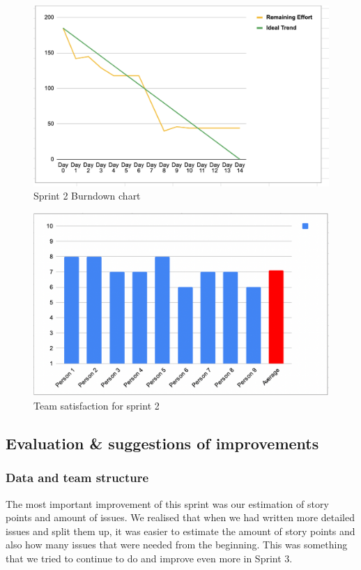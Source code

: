 \documentclass{article}
\begin{document}
\begin{figure}[h!]
    \centering
    \includegraphics[scale=0.6]{pfrFigures/Sprint2.png}
    \caption{Sprint 2 Burndown chart}
    \label{fig:Burndown1}
\end{figure}

\begin{figure}[h!]
    \centering
    \includegraphics[scale=0.6]{pfrFigures/TeamSatisfaction2.png}
    \caption{Team satisfaction for sprint 2}
    \label{fig:Satisfaction2}
\end{figure}

\subsection{Evaluation \& suggestions of improvements} 

\subsubsection{Data and team structure}
The most important improvement of this sprint was our estimation of story points and amount of issues. We realised that when we had written more detailed issues and split them up, it was easier to estimate the amount of story points and also how many issues that were needed from the beginning. This was something that we tried to continue to do and improve even more in Sprint 3. 
\end{document}
